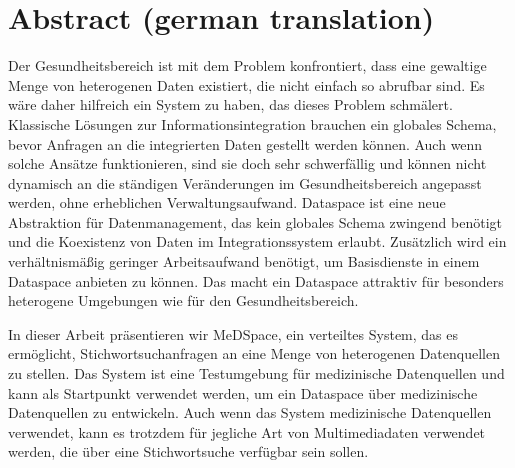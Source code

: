 \chapter*{Abstract (german translation)}

Der Gesundheitsbereich ist mit dem Problem konfrontiert, dass eine gewaltige Menge von heterogenen Daten existiert, die nicht einfach so abrufbar sind. Es wäre daher hilfreich ein System zu haben, das dieses Problem schmälert. 
Klassische Lösungen zur Informationsintegration brauchen ein globales Schema, bevor Anfragen an die integrierten Daten gestellt werden können. Auch wenn solche Ansätze funktionieren, sind sie doch sehr schwerfällig und können nicht dynamisch an die ständigen Veränderungen im Gesundheitsbereich angepasst werden, ohne erheblichen Verwaltungsaufwand. Dataspace ist eine neue Abstraktion für Datenmanagement, das kein globales Schema zwingend benötigt und die Koexistenz von Daten im Integrationssystem erlaubt. Zusätzlich wird ein verhältnismäßig geringer Arbeitsaufwand benötigt, um Basisdienste in einem Dataspace anbieten zu können. Das macht ein Dataspace attraktiv für besonders heterogene Umgebungen wie für den Gesundheitsbereich. 

In dieser Arbeit präsentieren wir MeDSpace, ein verteiltes System, das es ermöglicht, Stichwortsuchanfragen an eine Menge von heterogenen Datenquellen zu stellen. Das System ist eine Testumgebung für medizinische Datenquellen und kann als Startpunkt verwendet werden, um ein Dataspace über medizinische Datenquellen zu entwickeln. Auch wenn das System medizinische Datenquellen verwendet, kann es trotzdem für jegliche Art von Multimediadaten verwendet werden, die über eine Stichwortsuche verfügbar sein sollen.